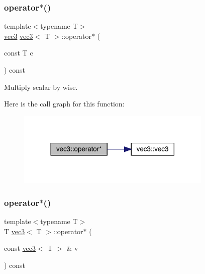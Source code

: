 \mbox{\label{structvec3_a769b2eeb0c298c38d62cf06ea50534d7}} 
\subsubsection{\texorpdfstring{operator$\ast$()}{operator*()}\hspace{0.1cm}{\footnotesize\ttfamily [1/2]}}
{\footnotesize\ttfamily template$<$typename T$>$ \\
\mbox{\hyperlink{structvec3}{vec3}} \mbox{\hyperlink{structvec3}{vec3}}$<$ T $>$\+::operator$\ast$ (\begin{DoxyParamCaption}\item[{const T}]{c }\end{DoxyParamCaption}) const\hspace{0.3cm}{\ttfamily [inline]}}



Multiply scalar by wise. 

Here is the call graph for this function\+:\nopagebreak
\begin{figure}[H]
\begin{center}
\leavevmode
\includegraphics[width=264pt]{structvec3_a769b2eeb0c298c38d62cf06ea50534d7_cgraph}
\end{center}
\end{figure}
\mbox{\label{structvec3_a339b8432cc6f88eb9da83c6075f1f5af}} 
\subsubsection{\texorpdfstring{operator$\ast$()}{operator*()}\hspace{0.1cm}{\footnotesize\ttfamily [2/2]}}
{\footnotesize\ttfamily template$<$typename T$>$ \\
T \mbox{\hyperlink{structvec3}{vec3}}$<$ T $>$\+::operator$\ast$ (\begin{DoxyParamCaption}\item[{const \mbox{\hyperlink{structvec3}{vec3}}$<$ T $>$ \&}]{v }\end{DoxyParamCaption}) const\hspace{0.3cm}{\ttfamily [inline]}}



